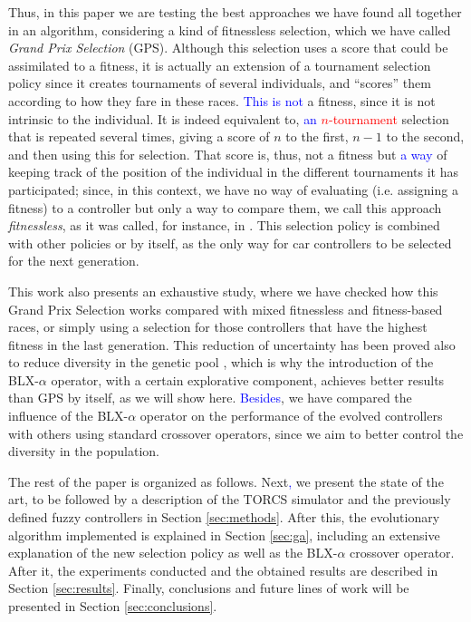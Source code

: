\documentclass[10pt,journal,compsoc]{IEEEtran}
\begin{document}
Thus, in this paper we are testing the best approaches we have found all together in an algorithm, considering a kind of fitnessless selection, which we have called \textit{Grand Prix Selection} (GPS). Although this selection uses a score that could be assimilated to a fitness, it is actually an extension of a tournament selection policy since it creates tournaments of several individuals, and ``scores'' them according to how they fare in these races. \textcolor{blue}{This is not} a fitness, since it is not intrinsic to the individual. It is indeed equivalent to, \textcolor{red}{\textcolor{blue}{an} $n$-tournament} selection that is repeated several times, giving a score of $n$ to the first, $n-1$ to the second, and then using this for selection. That score is, thus, not a fitness but \textcolor{blue}{ a way} of keeping track of the position of the individual in the different tournaments it has participated; since, in this context, we have no way of evaluating (i.e. assigning a fitness) to a controller but only a way to compare them, we call this approach {\em fitnessless}, as it was called, for instance, in \cite{jaskowski2008winning}.
This selection policy is combined with other policies or by itself, as the only way for car controllers to be selected for the next generation.

This work also presents an exhaustive study, where we have checked how this Grand Prix Selection works compared with mixed fitnessless and fitness-based races, or simply using a selection for those controllers that have the highest fitness in the last generation.  
This reduction of uncertainty has been proved also to reduce diversity in the genetic pool \cite{DBLP:journals/tcci/MereloLFGCCRMGTCC16}, which is why the introduction of the \mbox{BLX-$\alpha$} operator, with a certain explorative component, achieves better results than GPS by itself, as we will show here.
\textcolor{blue}{Besides}, we have compared the influence of the \mbox{BLX-$\alpha$} operator on the performance of the evolved controllers with others using standard crossover operators, since we aim to better control the diversity in the population.

The rest of the paper is organized as follows. Next\textcolor{blue}{,} we present the
state of the art, to be followed by a description of the TORCS
simulator and the previously defined fuzzy controllers in Section
\ref{sec:methods}. After this, the evolutionary algorithm implemented
is explained in Section \ref{sec:ga}, including an extensive explanation of the new selection policy as well as the BLX-$\alpha$ crossover operator. After it, the experiments conducted and the obtained results are described in
Section \ref{sec:results}. Finally, conclusions and future lines of
work will be presented in Section \ref{sec:conclusions}. 
\end{document}
